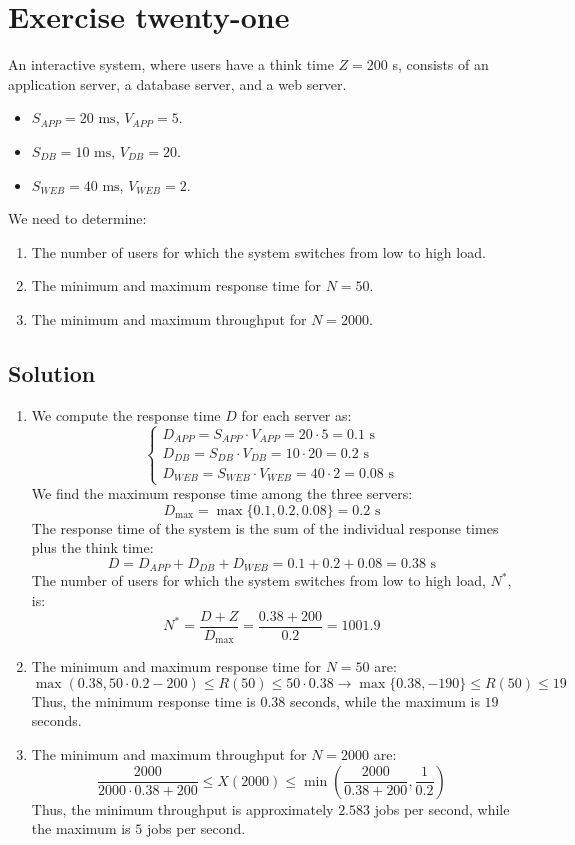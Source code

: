 \section{Exercise twenty-one}

An interactive system, where users have a think time $Z = 200$ s, consists of an application server, a database server, and a web server.
\begin{itemize}
    \item $S_{APP} = 20\text{ ms}$, $V_{APP} = 5$.
    \item $S_{DB} = 10\text{ ms}$, $V_{DB} = 20$.
    \item $S_{WEB} = 40\text{ ms}$, $V_{WEB} = 2$.
\end{itemize}
We need to determine:
\begin{enumerate}
    \item The number of users for which the system switches from low to high load.
    \item The minimum and maximum response time for $N = 50$.
    \item The minimum and maximum throughput for $N = 2000$.
\end{enumerate}

\subsection*{Solution}
\begin{enumerate}
    \item We compute the response time $D$ for each server as:
        \[\begin{cases}
            D_{APP}=S_{APP}\cdot V_{APP}= 20 \cdot 5 = 0.1\text{ s} \\
            D_{DB}=S_{DB}\cdot V_{DB}= 10 \cdot 20 = 0.2\text{ s} \\
            D_{WEB}=S_{WEB}\cdot V_{WEB}= 40 \cdot 2 = 0.08\text{ s}
        \end{cases}\]
        We find the maximum response time among the three servers:
        \[D_{\max}=\max\{0.1,0.2,0.08\}=0.2\text{ s}\]
        The response time of the system is the sum of the individual response times plus the think time:
        \[D=D_{APP}+D_{DB}+D_{WEB}=0.1+0.2+0.08=0.38\text{ s}\]
        The number of users for which the system switches from low to high load, $N^\ast$, is:
        \[N^\ast=\dfrac{D+Z}{D_{\max}}=\dfrac{0.38+200}{0.2}=1001.9\]
        \item The minimum and maximum response time for $N = 50$ are:
        \[\max\left(0.38,50\cdot 0.2-200\right) \leq R(50) \leq 50 \cdot 0.38\rightarrow\max\{0.38,-190\} \leq R(50) \leq 19\]
        Thus, the minimum response time is $0.38$ seconds, while the maximum is $19$ seconds.
    \item The minimum and maximum throughput for $N = 2000$ are:
        \[\dfrac{2000}{2000\cdot 0.38+200} \leq X(2000) \leq \min\left(\dfrac{2000}{0.38+200},\dfrac{1}{0.2}\right)\]
        Thus, the minimum throughput is approximately $2.583$ jobs per second, while the maximum is $5$ jobs per second.
\end{enumerate}